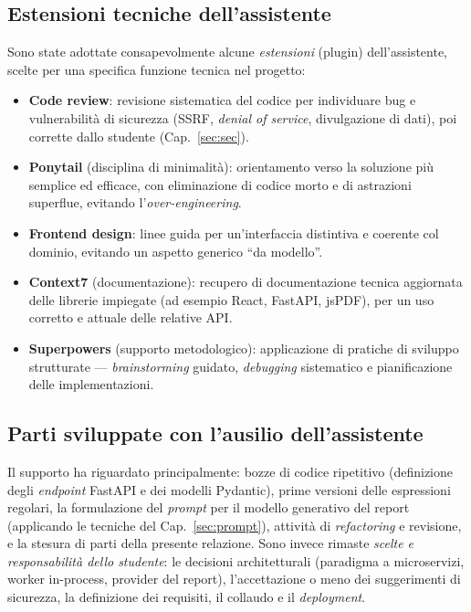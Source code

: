 \documentclass[11pt,a4paper]{article}
\begin{document}
\subsection{Estensioni tecniche dell'assistente}
Sono state adottate consapevolmente alcune \emph{estensioni} (plugin) dell'assistente,
scelte per una specifica funzione tecnica nel progetto:
\begin{itemize}[nosep]
  \item \textbf{Code review}: revisione sistematica del codice per individuare bug e
        vulnerabilità di sicurezza (SSRF, \emph{denial of service}, divulgazione di dati),
        poi corrette dallo studente (Cap.~\ref{sec:sec}).
  \item \textbf{Ponytail} (disciplina di minimalità): orientamento verso la soluzione più
        semplice ed efficace, con eliminazione di codice morto e di astrazioni superflue,
        evitando l'\emph{over-engineering}.
  \item \textbf{Frontend design}: linee guida per un'interfaccia distintiva e coerente col
        dominio, evitando un aspetto generico ``da modello''.
  \item \textbf{Context7} (documentazione): recupero di documentazione tecnica aggiornata
        delle librerie impiegate (ad esempio React, FastAPI, jsPDF), per un uso corretto e
        attuale delle relative API.
  \item \textbf{Superpowers} (supporto metodologico): applicazione di pratiche di sviluppo
        strutturate --- \emph{brainstorming} guidato, \emph{debugging} sistematico e
        pianificazione delle implementazioni.
\end{itemize}

\subsection{Parti sviluppate con l'ausilio dell'assistente}
Il supporto ha riguardato principalmente: bozze di codice ripetitivo (definizione degli
\emph{endpoint} FastAPI e dei modelli Pydantic), prime versioni delle espressioni
regolari, la formulazione del \emph{prompt} per il modello generativo del report
(applicando le tecniche del Cap.~\ref{sec:prompt}), attività di \emph{refactoring} e
revisione, e la stesura di parti della presente relazione. Sono invece rimaste
\emph{scelte e responsabilità dello studente}: le decisioni architetturali (paradigma a
microservizi, worker in-process, provider del report), l'accettazione o meno dei
suggerimenti di sicurezza, la definizione dei requisiti, il collaudo e il
\emph{deployment}.
\end{document}
